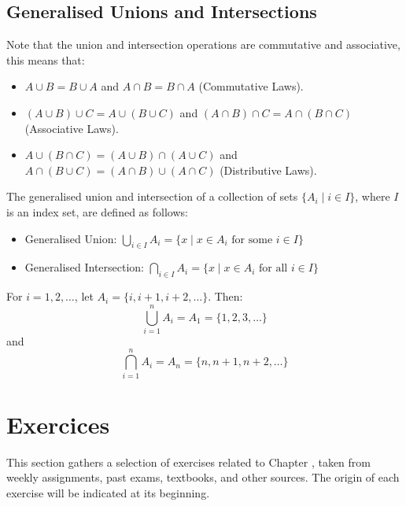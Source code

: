 \subsection{Generalised Unions and Intersections}
Note that the union and intersection operations are commutative and associative, this means that:
\begin{itemize}[itemsep=1pt,label=$\circ$]
    \item $A \cup B = B \cup A$ and $A \cap B = B \cap A$ (Commutative Laws).
    \item $(A \cup B) \cup C = A \cup (B \cup C)$ and $(A \cap B) \cap C = A \cap (B \cap C)$ (Associative Laws).
    \item $A \cup (B \cap C) = (A \cup B) \cap (A \cup C)$ and $A \cap (B \cup C) = (A \cap B) \cup (A \cap C)$ (Distributive Laws).
\end{itemize}

\begin{definition}
    The generalised union and intersection of a collection of sets $\{A_i \mid i \in I\}$, where $I$ is an index set, are defined as follows:
    \begin{itemize}[itemsep=1pt,label=$\circ$]
        \item Generalised Union: $\bigcup_{i \in I} A_i = \{x \mid x \in A_i \text{ for some } i \in I\}$
        \item Generalised Intersection: $\bigcap_{i \in I} A_i = \{x \mid x \in A_i \text{ for all } i \in I\}$
    \end{itemize}
\end{definition}

\begin{eg}
    For $i = 1,2,\ldots$, let $A_i = \{i, i + 1, i + 2, \ldots\}$. Then:
    \[ \bigcup_{i=1}^{n} A_i = A_1 = \{1, 2, 3, \ldots\} \]
    and
    \[ \bigcap_{i=1}^{n} A_i = A_n = \{n, n + 1, n + 2, \ldots\} \]
\end{eg}

\section{Exercices}
This section gathers a selection of exercises related to Chapter \thechapter, taken from weekly assignments, past exams, textbooks, and other sources. The origin of each exercise will be indicated at its beginning.

